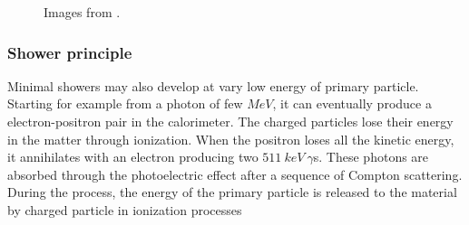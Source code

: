 \begin{figure}
	\centering
	 \quad
	\caption{Images from \cite{Leo}.}
\end{figure}

\subsubsection*{Shower principle}
Minimal showers may also develop at vary low energy of primary particle. Starting for example from a photon of few $MeV$, it can eventually produce a electron-positron pair in the calorimeter. The  charged  particles lose their energy in the matter through ionization. When the  positron loses all the kinetic energy, it annihilates with an electron producing two $511\ keV\ \gamma$s. These photons are absorbed through the photoelectric effect after a sequence of Compton scattering. During the process, the energy of the primary particle is released to the material by charged particle in ionization processes

